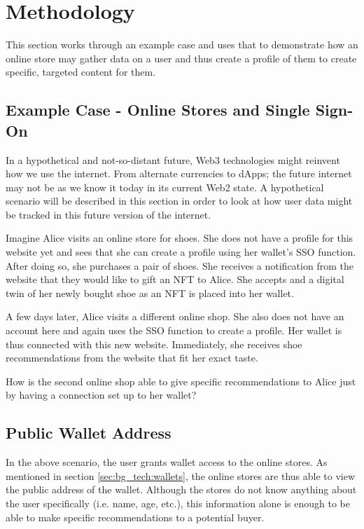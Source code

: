 \chapter{Methodology}
\label{ch:methodology}
This section works through an example case and uses that to demonstrate how an online store may gather data on a user and thus create a profile of them to create specific, targeted content for them.


%
%
\section{Example Case - Online Stores and Single Sign-On}
\label{sec:methodology:caseStudy}
In a hypothetical and not-so-distant future, Web3 technologies might reinvent how we use the internet. From alternate currencies to dApps; the future internet may not be as we know it today in its current Web2 state. A hypothetical scenario will be described in this section in order to look at how user data might be tracked in this future version of the internet.

Imagine Alice visits an online store for shoes. She does not have a profile for this website yet and sees that she can create a profile using her wallet's SSO function. After doing so, she purchases a pair of shoes. She receives a notification from the website that they would like to gift an NFT to Alice. She accepts and a digital twin of her newly bought shoe as an NFT is placed into her wallet.

A few days later, Alice visits a different online shop. She also does not have an account here and again uses the SSO function to create a profile. Her wallet is thus connected with this new website. Immediately, she receives shoe recommendations from the website that fit her exact taste.

How is the second online shop able to give specific recommendations to Alice just by having a connection set up to her wallet?


%
%
\section{Public Wallet Address}
\label{sec:methodology:address}
In the above scenario, the user grants wallet access to the online stores. As mentioned in section \ref{sec:bg_tech:wallets}, the online stores are thus able to view the public address of the wallet. Although the stores do not know anything about the user specifically (i.e. name, age, etc.), this information alone is enough to be able to make specific recommendations to a potential buyer.

